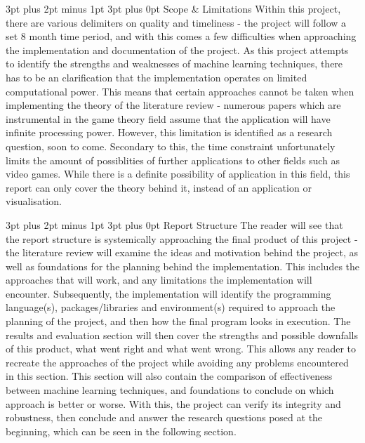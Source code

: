 \documentclass[12pt,a4paper]{article}
\makeatletter
\renewcommand\subsection{\@startsection {subsection}{1}{2mm}
                               {3pt plus 2pt minus 1pt}
                               {3pt plus 0pt}
                               {\normalfont\bfseries}}
\makeatother
\begin{document}
\subsection{Scope \& Limitations}
Within this project, there are various delimiters on quality and timeliness - the project will follow a set 8 month time period, and with this comes a few difficulties when approaching the implementation and documentation of the project. As this project attempts to identify the strengths and weaknesses of machine learning techniques, there has to be an clarification that the implementation operates on limited computational power. This means that certain approaches cannot be taken when implementing the theory of the literature review - numerous papers which are instrumental in the game theory field assume that the application will have infinite processing power. However, this limitation is identified as a research question, soon to come. Secondary to this, the time constraint unfortunately limits the amount of possiblities of further applications to other fields such as video games. While there is a definite possibility of application in this field, this report can only cover the theory behind it, instead of an application or visualisation.

\subsection{Report Structure}
The reader will see that the report structure is systemically approaching the final product of this project - the literature review will examine the ideas and motivation behind the project, as well as foundations for the planning behind the implementation. This includes the approaches that will work, and any limitations the implementation will encounter. Subsequently, the implementation will identify the programming language(s), packages/libraries and environment(s) required to approach the planning of the project, and then how the final program looks in execution. The results and evaluation section will then cover the strengths and possible downfalls of this product, what went right and what went wrong. This allows any reader to recreate the approaches of the project while avoiding any problems encountered in this section. This section will also contain the comparison of effectiveness between machine learning techniques, and foundations to conclude on which approach is better or worse. With this, the project can verify its integrity and robustness, then conclude and answer the research questions posed at the beginning, which can be seen in the following section.
\end{document}
